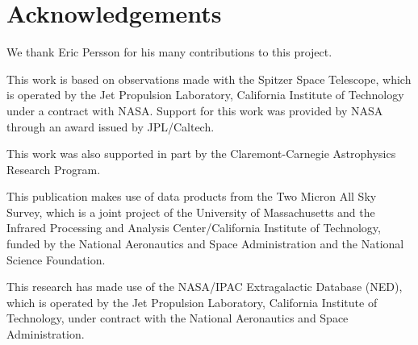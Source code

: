 \documentclass[a4paper,fleqn,usenatbib]{mnras}
\begin{document}

\section*{Acknowledgements}
\label{sec:acknowledgements}

We thank Eric Persson for his many contributions to this project.

This work is based on observations made with the Spitzer Space Telescope, which is operated by the Jet Propulsion Laboratory, California Institute of Technology under a contract with NASA. Support for this work was provided by NASA through an award issued by JPL/Caltech.

This work was also supported in part by the Claremont-Carnegie Astrophysics Research Program.

This publication makes use of data products from the Two Micron All Sky Survey, which is a joint project of the University of Massachusetts and the Infrared Processing and Analysis Center/California Institute of Technology, funded by the National Aeronautics and Space Administration and the National Science Foundation.

This research has made use of the NASA/IPAC Extragalactic Database (NED), which is operated by the Jet Propulsion Laboratory, California Institute of Technology, under contract with the National Aeronautics and Space Administration.










\end{document}
